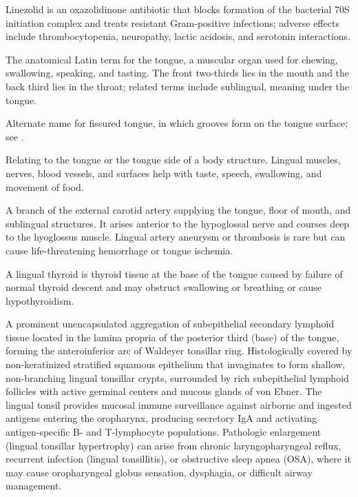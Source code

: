  Linezolid is an oxazolidinone antibiotic that blocks formation of the bacterial 70S initiation complex and treats resistant Gram-positive infections; adverse effects include thrombocytopenia, neuropathy, lactic acidosis, and serotonin interactions.

 The anatomical Latin term for the tongue, a muscular organ used for chewing, swallowing, speaking, and tasting. The front two-thirds lies in the mouth and the back third lies in the throat; related terms include sublingual, meaning under the tongue.

 Alternate name for fissured tongue, in which grooves form on the tongue surface; see .

 Relating to the tongue or the tongue side of a body structure. Lingual muscles, nerves, blood vessels, and surfaces help with taste, speech, swallowing, and movement of food.

 A branch of the external carotid artery supplying the tongue, floor of mouth, and
sublingual structures. It arises anterior to the hypoglossal nerve and courses deep to
the hyoglossus muscle. Lingual artery aneurysm or thrombosis is rare but can cause
life-threatening hemorrhage or tongue ischemia.

 A lingual thyroid is thyroid tissue at the base of the tongue caused by failure of normal thyroid descent and may obstruct swallowing or breathing or cause hypothyroidism.

 A prominent unencapsulated aggregation of subepithelial secondary lymphoid tissue located in the lamina propria of the posterior third (base) of the tongue, forming the anteroinferior arc of Waldeyer tonsillar ring. Histologically covered by non-keratinized stratified squamous epithelium that invaginates to form shallow, non-branching lingual tonsillar crypts, surrounded by rich subepithelial lymphoid follicles with active germinal centers and mucous glands of von Ebner. The lingual tonsil provides mucosal immune surveillance against airborne and ingested antigens entering the oropharynx, producing secretory IgA and activating antigen-specific B- and T-lymphocyte populations. Pathologic enlargement (lingual tonsillar hypertrophy) can arise from chronic laryngopharyngeal reflux, recurrent infection (lingual tonsillitis), or obstructive sleep apnea (OSA), where it may cause oropharyngeal globus sensation, dysphagia, or difficult airway management.


